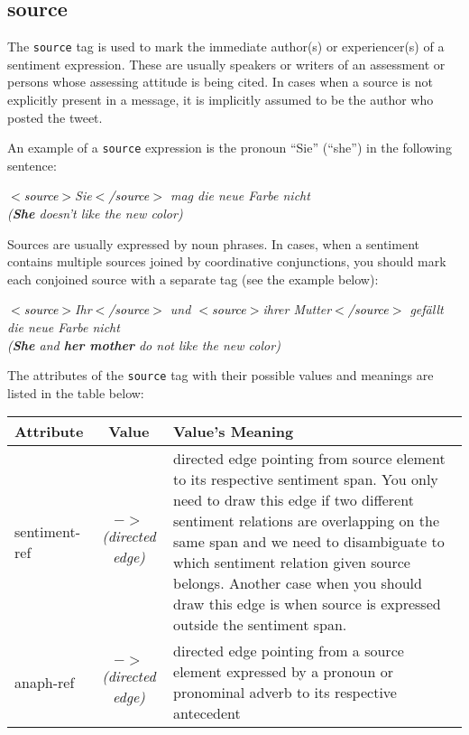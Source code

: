 \documentclass[11pt,a4paper]{article}
\newenvironment{example}{\begin{center}\begin{exe}\ex}{\end{exe}\end{center}}
\newcommand{\xmltag}[1]{\textcolor{black}{{\small$<$#1$>$}}}
\newcommand{\source}[1]{\xmltag{source}\textcolor{orange3}{#1}\xmltag{/source}}
\renewenvironment{example}{\begin{center}\itshape}{\upshape\end{center}}
\newlength\clmnwidth
\begin{document}
\subsection{source}
The \texttt{source} tag is used to mark the immediate author(s) or
experiencer(s) of a sentiment expression.  These are usually speakers
or writers of an assessment or persons whose assessing attitude is
being cited.  In cases when a source is not explicitly present in a
message, it is implicitly assumed to be the author who posted the
tweet.

An example of a \texttt{source} expression is the pronoun ``Sie''
(``she'') in the following sentence:
\begin{example}
  \textit{\source{Sie} mag die neue Farbe
    nicht}\\ (\textit{\textbf{She} doesn't like the new color})
\end{example}
Sources are usually expressed by noun phrases.  In cases, when a
sentiment contains multiple sources joined by coordinative
conjunctions, you should mark each conjoined source with a separate
tag (see the example below):
\begin{example}
  \textit{\source{Ihr} und \source{ihrer Mutter} gef\"allt die neue
    Farbe nicht}\\ (\textit{\textbf{She} and \textbf{her mother} do not
    like the new color})
\end{example}

The attributes of the \texttt{source} tag with their possible values
and meanings are listed in the table below:\\
\begin{tabular}{|l|c|p{\clmnwidth}|}\hline
  Attribute & Value & Value's Meaning\\\hline sentiment-ref &
  \textit{$->$\newline(directed edge)} & directed edge pointing from
  source element to its respective sentiment span.  You only need to
  draw this edge if two different sentiment relations are overlapping
  on the same span and we need to disambiguate to which sentiment
  relation given source belongs.  Another case when you should draw
  this edge is when source is expressed outside the sentiment
  span.\\\hline

  anaph-ref & \textit{$->$\newline(directed edge)} & directed edge
  pointing from a source element expressed by a pronoun or pronominal
  adverb to its respective antecedent\\\hline
\end{tabular}
\vspace{0.5cm}
\end{document}
